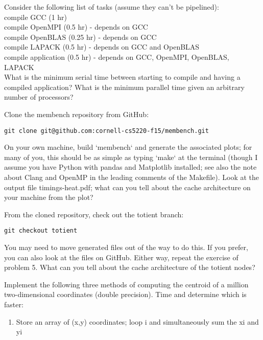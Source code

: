 \documentclass{5220hw}
\begin{document}
\begin{exercises}
\item Consider the following list of tasks (assume they can't be pipelined): \\

compile GCC (1 hr) \\
compile OpenMPI (0.5 hr) - depends on GCC \\
compile OpenBLAS (0.25 hr) - depends on GCC \\
compile LAPACK (0.5 hr) - depends on GCC and OpenBLAS \\
compile application (0.5 hr) - depends on GCC, OpenMPI, OpenBLAS, LAPACK \\

What is the minimum serial time between starting to compile and having a compiled application?  What is the minimum parallel time given an arbitrary number of processors?

\item Clone the membench repository from GitHub:
\begin{lstlisting}
git clone git@github.com:cornell-cs5220-f15/membench.git
\end{lstlisting}

On your own machine, build `membench` and generate the associated plots; for many of you, this should be as simple as typing `make` at the terminal (though I assume you have Python with pandas and Matplotlib installed; see also the note about Clang and OpenMP in the leading comments of the Makefile).  Look at the output file timings-heat.pdf; what can you tell about the cache architecture on your machine from the plot?

\item From the cloned repository, check out the totient branch:

\begin{lstlisting}
git checkout totient
\end{lstlisting}

You may need to move generated files out of the way to do this. If you prefer, you can also look at the files on GitHub. Either way, repeat the exercise of problem 5.  What can you tell about the cache architecture of the totient nodes?

\item Implement the following three methods of computing the centroid of a million two-dimensional coordinates (double precision). Time and determine which is faster:

\begin{enumerate}
    \item  Store an array of (x,y) coordinates; loop i and simultaneously sum the xi and yi


\end{enumerate}
\end{exercises}
\end{document}
